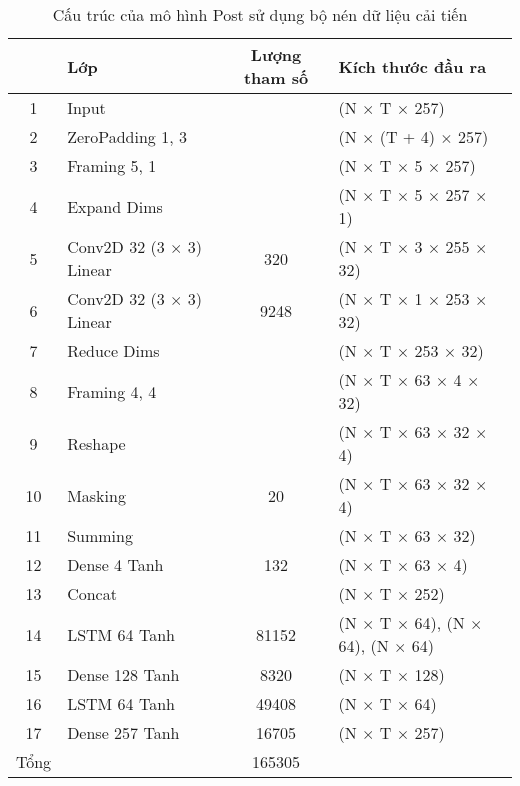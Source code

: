 				\begin{table}
					\centering
					\begin{tabular}{c l c l}
						\hline
						& \textbf{Lớp}		& \textbf{Lượng tham số}		& \textbf{Kích thước đầu ra} \\
						\hline
						1		& Input						&								& (N $\times$ T $\times$ 257) \\
						2		& ZeroPadding 1, 3			&								& (N $\times$ (T + 4) $\times$ 257) \\
						3		& Framing 5, 1				&								& (N $\times$ T $\times$ 5 $\times$ 257) \\
						4		& Expand Dims				&								& (N $\times$ T $\times$ 5 $\times$ 257 $\times$ 1) \\
						5		& Conv2D 32 (3 $\times$ 3) Linear	&	320							& (N $\times$ T $\times$ 3 $\times$ 255 $\times$ 32) \\
						6		& Conv2D 32 (3 $\times$ 3)	Linear	&	9248						& (N $\times$ T $\times$ 1 $\times$ 253 $\times$ 32) \\
						7		& Reduce Dims				&								& (N $\times$ T $\times$ 253 $\times$ 32) \\
						8		& Framing 4, 4				&								& (N $\times$ T $\times$ 63 $\times$ 4 $\times$ 32) \\
						9		& Reshape					&								& (N $\times$ T $\times$ 63 $\times$ 32 $\times$ 4) \\
						10		& Masking					&	20							& (N $\times$ T $\times$ 63 $\times$ 32 $\times$ 4) \\
						11		& Summing					&								& (N $\times$ T $\times$ 63 $\times$ 32) \\
						12		& Dense 4 Tanh				&	132							& (N $\times$ T $\times$ 63 $\times$ 4) \\
						13		& Concat					&								& (N $\times$ T $\times$ 252) \\
						14		& LSTM 64 Tanh				&	81152						& (N $\times$ T $\times$ 64), (N $\times$ 64), (N $\times$ 64) \\
						15		& Dense 128 Tanh			&	8320						& (N $\times$ T $\times$ 128) \\
						16		& LSTM 64 Tanh				&	49408						& (N $\times$ T $\times$ 64) \\
						17		& Dense 257 Tanh			&	16705						& (N $\times$ T $\times$ 257) \\
						\hline
						Tổng	& 							&	165305						& \\
						\hline
					\end{tabular}
					\caption{Cấu trúc của mô hình Post sử dụng bộ nén dữ liệu cải tiến}
					\label{rl::post_lookahead_enhanced_final}
				\end{table}
			
